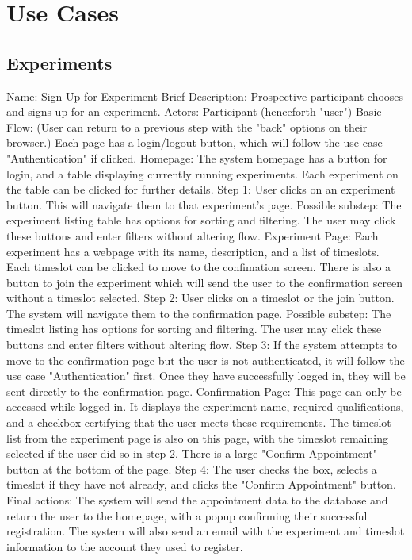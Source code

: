 \section{Use Cases}
\subsection{Experiments}
\begin{outline}[enumerate]
\1 Name: Sign Up for Experiment
\2 Brief Description: Prospective participant chooses and signs up for an experiment.
\2 Actors: Participant (henceforth "user")
\2 Basic Flow: (User can return to a previous step with the "back" options on their browser.)  Each page has a login/logout button, which will follow the use case "Authentication" if clicked.
\3 Homepage: The system homepage has a button for login, and a table displaying currently running experiments.  Each experiment on the table can be clicked for further details.
\3 Step 1: User clicks on an experiment button.  This will navigate them to that experiment's page.
\4 Possible substep: The experiment listing table has options for sorting and filtering.  The user may click these buttons and enter filters without altering flow.
\3 Experiment Page: Each experiment has a webpage with its name, description, and a list of timeslots.  Each timeslot can be clicked to move to the confimation screen.  There is also a button to join the experiment which will send the user to the confirmation screen without a timeslot selected.
\3 Step 2: User clicks on a timeslot or the join button.  The system will navigate them to the confirmation page.
\4 Possible substep: The timeslot listing has options for sorting and filtering.  The user may click these buttons and enter filters without altering flow.
\3 Step 3: If the system attempts to move to the confirmation page but the user is not authenticated, it will follow the use case "Authentication" first.  Once they have successfully logged in, they will be sent directly to the confirmation page.
\3 Confirmation Page: This page can only be accessed while logged in.  It displays the experiment name, required qualifications, and a checkbox certifying that the user meets these requirements.  The timeslot list from the experiment page is also on this page, with the timeslot remaining selected if the user did so in step 2.  There is a large "Confirm Appointment" button at the bottom of the page.
\3 Step 4: The user checks the box, selects a timeslot if they have not already, and clicks the "Confirm Appointment" button.
\3 Final actions: The system will send the appointment data to the database and return the user to the homepage, with a popup confirming their successful registration.  The system will also send an email with the experiment and timeslot information to the account they used to register.

\end{outline}
